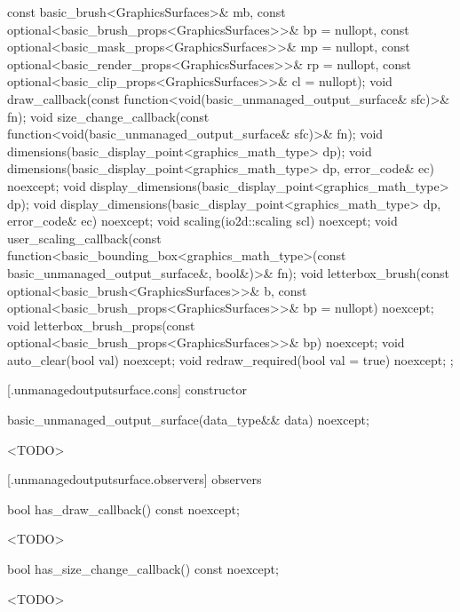 \begin{codeblock}
{{      const basic_brush<GraphicsSurfaces>& mb,
      const optional<basic_brush_props<GraphicsSurfaces>>& bp = nullopt,
      const optional<basic_mask_props<GraphicsSurfaces>>& mp = nullopt,
      const optional<basic_render_props<GraphicsSurfaces>>& rp = nullopt,
      const optional<basic_clip_props<GraphicsSurfaces>>& cl = nullopt);
    void draw_callback(const function<void(basic_unmanaged_output_surface& sfc)>& fn);
    void size_change_callback(const function<void(basic_unmanaged_output_surface& sfc)>& fn);
    void dimensions(basic_display_point<graphics_math_type> dp);
    void dimensions(basic_display_point<graphics_math_type> dp, error_code& ec) noexcept;
    void display_dimensions(basic_display_point<graphics_math_type> dp);
    void display_dimensions(basic_display_point<graphics_math_type> dp, error_code& ec) noexcept;
    void scaling(io2d::scaling scl) noexcept;
    void user_scaling_callback(const
      function<basic_bounding_box<graphics_math_type>(const
      basic_unmanaged_output_surface&, bool&)>& fn);
    void letterbox_brush(const optional<basic_brush<GraphicsSurfaces>>& b,
      const optional<basic_brush_props<GraphicsSurfaces>>& bp = nullopt) noexcept;
    void letterbox_brush_props(const optional<basic_brush_props<GraphicsSurfaces>>& bp) noexcept;
    void auto_clear(bool val) noexcept;
    void redraw_required(bool val = true) noexcept;
  };
}
\end{codeblock}

 [\iotwod.unmanagedoutputsurface.cons] { constructor}

%
\begin{itemdecl}
basic_unmanaged_output_surface(data_type&& data) noexcept;
\end{itemdecl}
\begin{itemdescr}
\pnum
<TODO>
\end{itemdescr}

 [\iotwod.unmanagedoutputsurface.observers] { observers}

%
\begin{itemdecl}
bool has_draw_callback() const noexcept;
\end{itemdecl}
\begin{itemdescr}
\pnum
\returns
<TODO>
\end{itemdescr}

%
\begin{itemdecl}
bool has_size_change_callback() const noexcept;
\end{itemdecl}
\begin{itemdescr}
\pnum
\returns
<TODO>
\end{itemdescr}

